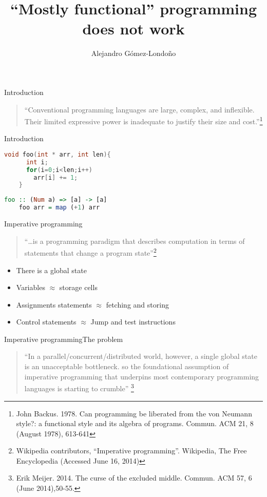 \documentclass[rail]{beamer}
\title{``Mostly functional'' programming does not work}
\author{Alejandro Gómez-Londoño}
\institute{EAFIT University}
\begin{document}
\begin{frame}
  \titlepage
\end{frame}

\begin{frame}{Introduction}
  \begin{quote}
    ``Conventional programming languages are large, complex, and
    inflexible. Their limited expressive power is inadequate to
    justify their size and cost.''\footnote[frame,1] {John
      Backus. 1978. Can programming be liberated from the von Neumann
      style?: a functional style and its algebra of
      programs. Commun. ACM 21, 8 (August 1978), 613-641}
  \end{quote}
\end{frame}

\begin{frame}[fragile]{Introduction}

  \begin{lstlisting}[language=C]
    void foo(int * arr, int len){
      int i;
      for(i=0;i<len;i++)
        arr[i] += 1;
    }
  \end{lstlisting}
  \pause
  \begin{lstlisting}[language=Haskell]
    foo :: (Num a) => [a] -> [a]
    foo arr = map (+1) arr
  \end{lstlisting}
\end{frame}

\begin{frame}{Imperative programming}
  \begin{quote}
    ``\dots is a programming paradigm that describes computation in terms
    of statements that change a program state''\footnote[frame,1]
    {Wikipedia contributors, ``Imperative programming''.
      Wikipedia, The Free Encyclopedia (Accessed June 16, 2014)}
  \end{quote}
  \pause
  \begin{itemize}[<+->]
  \item There is a global state
  \item Variables $\approx$ storage cells
  \item Assignments statements $\approx$ fetching and storing
  \item Control statements $\approx$ Jump and test instructions
  \end{itemize}
\end{frame}

\begin{frame}{Imperative programming}{The problem}
  \begin{quote}
    ``In a parallel/concurrent/distributed world, however, a single
    global state is an unacceptable bottleneck. so the foundational
    assumption of imperative programming that underpins most
    contemporary programming languages is starting to crumble''
    \footnote[frame,1] {Erik Meijer. 2014. The curse of the
      excluded middle. Commun. ACM 57, 6 (June 2014),50-55.}
  \end{quote}

\end{frame}
\end{document}
